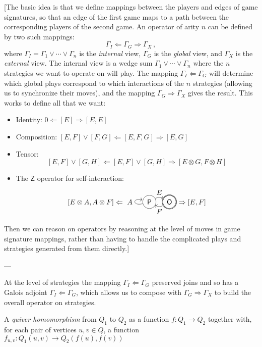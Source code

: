 \documentclass[format=sigplan,authordraft]{acmart}
\newcommand{\kw}[1]{\ensuremath{ \mathsf{#1} }}
\begin{document}
[The basic idea is that we define
mappings between the players and edges of game signatures,
so that an edge of the first game maps to a path between
the corresponding players of the second game.
An operator of arity $n$ can be defined by two such mappings:
\[ \Gamma_I \Leftarrow \Gamma_G \Rightarrow \Gamma_X \,, \]
where $\Gamma_I = \Gamma_1 \vee \cdots \vee \Gamma_n$ is the \emph{internal} view,
$\Gamma_G$ is the \emph{global} view,
and $\Gamma_X$ is the \emph{external} view.
The internal view is a wedge sum
$\Gamma_1 \vee \cdots \vee \Gamma_n$
where the $n$ strategies we want to operate on
will play.
The mapping $\Gamma_I \Leftarrow \Gamma_G$
will determine which global plays correspond
to which interactions of the $n$ strategies
(allowing us to synchronize their moves),
and the mapping $\Gamma_G \Rightarrow \Gamma_X$
gives the result.
This works to define all that we want:
\begin{itemize}
\item Identity: $0 \Leftarrow [E] \Rightarrow [E,E]$
\item Composition: $[E,F] \vee [F,G] \Leftarrow [E,F,G] \Rightarrow [E,G]$
\item Tensor: \[ [E,F] \vee [G,H] \Leftarrow [E,F] \vee [G,H] \Rightarrow
  [E \otimes G, F \otimes H] \]
\item The $\kw{Z}$ operator for self-interaction:
  \[ [E \otimes A, A \otimes F] \Leftarrow
  \begin{tikzpicture}[baseline=(O.base)]
    \node[circle,draw] (P) at (-1,0) {$\kw{P}$};
    \node[circle,draw,double] (O) at (0,0) {$\kw{O}$};
    \path[->] (P) edge[loop left] node[auto] {$A$} (P);
    \path[->] (P) edge[bend left] node[above] {$E$} (O);
    \path[->] (O) edge[bend left] node[below] {$F$} (P);
  \end{tikzpicture} \Rightarrow [E,F] \]
\end{itemize}
Then we can reason on operators by reasoning at the level of moves
in game signature mappings,
rather than having to handle the complicated
plays and strategies generated from them
directly.]

---

At the level of strategies the mapping
$\Gamma_I \Leftarrow \Gamma_G$ preserved joins
and so has a Galois adjoint $\Gamma_I \Leftarrow \Gamma_G$,
which allows us to compose with $\Gamma_G \Rightarrow \Gamma_X$
to build the overall operator on strategies.

\begin{definition}
A \emph{quiver homomorphism} from $Q_1$ to $Q_2$
as a function $f : Q_1 \rightarrow Q_2$ together with,
for each pair of vertices $u, v \in Q$,
a function $f_{u,v} : Q_1(u, v) \rightarrow Q_2(f(u), f(v))$
\end{definition}
\end{document}
